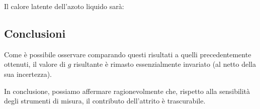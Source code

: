 \documentclass{article}
\begin{document}
  Il calore latente dell'azoto liquido sarà:

\subsection{Conclusioni}

Come è possibile osservare comparando questi risultati a
quelli precedentemente ottenuti, il valore di $g$ risultante
è rimasto essenzialmente invariato (al netto della sua incertezza).

In conclusione, possiamo affermare ragionevolmente che,
rispetto alla sensibilità degli strumenti di misura,
il contributo dell'attrito è trascurabile.
\end{document}
